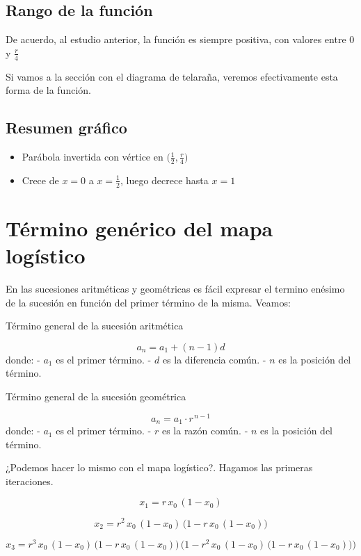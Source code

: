 \documentclass[
  11pt,
  a4paper,
  DIV=11,
  numbers=noendperiod]{scrreprt}
\providecommand{\tightlist}{%
  \setlength{\itemsep}{0pt}\setlength{\parskip}{0pt}}
\begin{document}
\section{Rango de la función}\label{rango-de-la-funciuxf3n}

De acuerdo, al estudio anterior, la función es siempre positiva, con
valores entre \(0\) y \(\tfrac{r}{4}\)

Si vamos a la sección con el diagrama de telaraña, veremos efectivamente
esta forma de la función.

\section{Resumen gráfico}\label{resumen-gruxe1fico}

\begin{itemize}
\tightlist
\item
  Parábola invertida con vértice en
  \(\bigl(\tfrac12,\tfrac{r}{4}\bigr)\)\\
\item
  Crece de \(x=0\) a \(x=\tfrac12\), luego decrece hasta \(x=1\)
\end{itemize}

\chapter{Término genérico del mapa
logístico}\label{tuxe9rmino-genuxe9rico-del-mapa-loguxedstico}

En las sucesiones aritméticas y geométricas es fácil expresar el termino
enésimo de la sucesión en función del primer término de la misma.
Veamos:

Término general de la sucesión aritmética

\[a_n = a_1 + (n-1)d\] donde: - \(a_1\) es el primer término. - \(d\) es
la diferencia común. - \(n\) es la posición del término.

Término general de la sucesión geométrica

\[a_n = a_1 \cdot r^{\,n-1}\] donde: - \(a_1\) es el primer término. -
\(r\) es la razón común. - \(n\) es la posición del término.

¿Podemos hacer lo mismo con el mapa logístico?. Hagamos las primeras
iteraciones.

\[
x_1 = r\,x_0\,(1 - x_0)
\]

\[
x_2 = r^2\,x_0\,(1 - x_0)\,\bigl(1 - r\,x_0\,(1 - x_0)\bigr)
\]

\[
x_3 = r^3\,x_0\,(1 - x_0)\,
\bigl(1 - r\,x_0\,(1 - x_0)\bigr)\,
\bigl(1 - r^2\,x_0\,(1 - x_0)\,\bigl(1 - r\,x_0\,(1 - x_0)\bigr)\bigr)
\]
\end{document}
